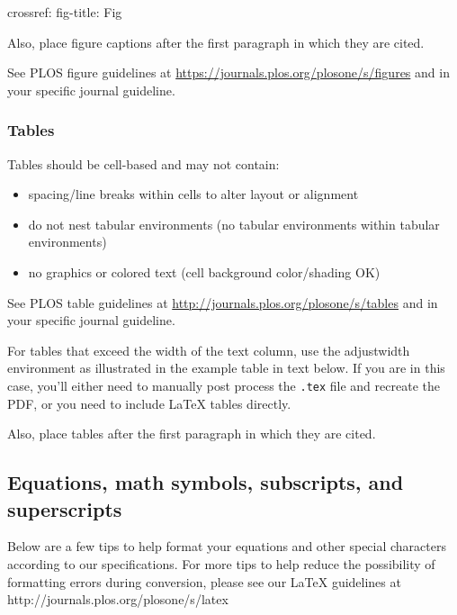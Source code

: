 \documentclass[
  10pt,
  letterpaper,
]{article}
\newenvironment{Shaded}{\begin{snugshade}}{\end{snugshade}}
\newcommand{\AttributeTok}[1]{\textcolor[rgb]{0.40,0.45,0.13}{#1}}
\newcommand{\FunctionTok}[1]{\textcolor[rgb]{0.28,0.35,0.67}{#1}}
\newcommand{\KeywordTok}[1]{\textcolor[rgb]{0.00,0.23,0.31}{#1}}
\providecommand{\tightlist}{%
  \setlength{\itemsep}{0pt}\setlength{\parskip}{0pt}}\usepackage{longtable,booktabs,array}
\begin{document}
\begin{Shaded}
\begin{Highlighting}[]
\FunctionTok{crossref}\KeywordTok{:}
\AttributeTok{  }\FunctionTok{fig{-}title}\KeywordTok{:}\AttributeTok{ Fig }
\end{Highlighting}
\end{Shaded}

Also, place figure captions after the first paragraph in which they are
cited.

See PLOS figure guidelines at
\url{https://journals.plos.org/plosone/s/figures} and in your specific
journal guideline.

\subsubsection{Tables}\label{tables}

Tables should be cell-based and may not contain:

\begin{itemize}
\tightlist
\item
  spacing/line breaks within cells to alter layout or alignment
\item
  do not nest tabular environments (no tabular environments within
  tabular environments)
\item
  no graphics or colored text (cell background color/shading OK)
\end{itemize}

See PLOS table guidelines at
\url{http://journals.plos.org/plosone/s/tables} and in your specific
journal guideline.

For tables that exceed the width of the text column, use the adjustwidth
environment as illustrated in the example table in text below. If you
are in this case, you'll either need to manually post process the
\texttt{.tex} file and recreate the PDF, or you need to include LaTeX
tables directly.

Also, place tables after the first paragraph in which they are cited.

\subsection{Equations, math symbols, subscripts, and
superscripts}\label{equations-math-symbols-subscripts-and-superscripts}

Below are a few tips to help format your equations and other special
characters according to our specifications. For more tips to help reduce
the possibility of formatting errors during conversion, please see our
LaTeX guidelines at http://journals.plos.org/plosone/s/latex
\end{document}
